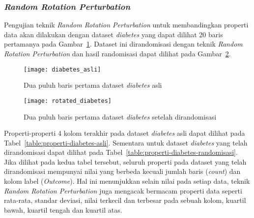 \subsubsection{\textit{Random Rotation Perturbation}}
\label{subsubsec:pengujian-properti-rrp}

Pengujian teknik \textit{Random Rotation Perturbation} untuk membandingkan properti data akan dilakukan dengan dataset \textit{diabetes} yang dapat dilihat 20 baris pertamanya pada Gambar~\ref{fig:diabetes_asli}. Dataset ini dirandomisasi dengan teknik \textit{Random Rotation Perturbation} dan hasil randomisasi dapat dilihat pada Gambar~\ref{fig:rotated_diabetes}.

\begin{figure}
	\centering
	\texttt{[image: diabetes\_asli]}
	\caption{Dua puluh baris pertama dataset \textit{diabetes} asli}
	\label{fig:diabetes_asli}
\end{figure}

\begin{figure}
	\centering
	\texttt{[image: rotated\_diabetes]}
	\caption{Dua puluh baris pertama dataset \textit{diabetes} setelah dirandomisasi}
	\label{fig:rotated_diabetes}
\end{figure}

Properti-properti 4 kolom terakhir pada dataset \textit{diabetes} asli dapat dilihat pada Tabel~\ref{table:properti-diabetes-asli}. Sementara untuk dataset \textit{diabetes} yang telah dirandomisasi dapat dilihat pada Tabel~\ref{table:properti-diabetes-randomisasi}. Jika dilihat pada kedua tabel tersebut, seluruh properti pada dataset yang telah dirandomisasi mempunyai nilai yang berbeda kecuali jumlah baris (\textit{count}) dan kolom label (\textit{Outcome}). Hal ini menunjukkan selain nilai pada setiap data, teknik \textit{Random Rotation Perturbation} juga mengacak bermacam properti data seperti rata-rata, standar deviasi, nilai terkecil dan terbesar pada sebuah kolom, kuartil bawah, kuartil tengah dan kuartil atas.
	
